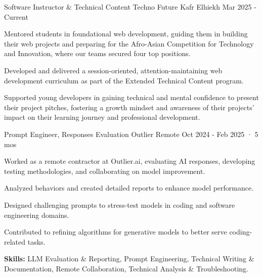 

\begin{cventries}


\cventry
{Software Instructor \& Technical Content} %
{Techno Future} %
{Kafr Elhiekh} %
{Mar 2025 - Current} %
{
  \begin{cvitems} %
    \item {Mentored students in foundational web development, guiding them in building their web projects and preparing for the Afro-Asian Competition for Technology and Innovation, where our teams secured four top positions.}
    \item {Developed and delivered a session-oriented, attention-maintaining web development curriculum as part of the Extended Technical Content program.}
    \item {Supported young developers in gaining technical and mental confidence to present their project pitches, fostering a growth mindset and awareness of their projects' impact on their learning journey and professional development.}
  \end{cvitems}
}


  \cventry
    {Prompt Engineer, Responses Evaluation} %
    {Outlier} %
    {Remote} %
    {Oct 2024 - Feb 2025 · 5 mos} %
    {
      \begin{cvitems} %
        \item {Worked as a remote contractor at Outlier.ai, evaluating AI responses, developing testing methodologies, and collaborating on model improvement.}
        \item {Analyzed behaviors and created detailed reports to enhance model performance.}
        \item {Designed challenging prompts to stress-test models in coding and software engineering domains.}
        \item {Contributed to refining algorithms for generative models to better serve coding-related tasks.}
        \item {\textbf{Skills:} LLM Evaluation \& Reporting, Prompt Engineering, Technical Writing \& Documentation, Remote Collaboration, Technical Analysis \& Troubleshooting.}
      \end{cvitems}
    }



\end{cventries}
